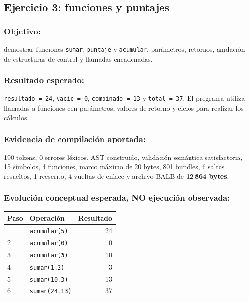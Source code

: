 \subsection{Ejercicio 3: funciones y puntajes}
\label{83-ejercicio-3-funciones-y-puntajes}

\subsubsection{Objetivo:} demostrar funciones
\texttt{sumar}, \texttt{puntaje} y
\texttt{acumular}, parámetros, retornos,
anidación de estructuras de control y
llamadas encadenadas.

\subsubsection{Resultado esperado:}
\texttt{resultado = 24},
\texttt{vacio = 0},
\texttt{combinado = 13} y
\texttt{total = 37}.
El programa utiliza llamadas a funciones
con parámetros, valores de retorno y ciclos
para realizar los cálculos.

\subsubsection{Evidencia de compilación aportada:}
190 tokens, 0 errores léxicos, AST construido,
validación semántica satisfactoria,
15 símbolos, 4 funciones, marco máximo
de 20 bytes, 801 bundles, 6 saltos
resueltos, 1 reescrito, 4 vueltas de
enlace y archivo BALB de
\textbf{12\,864 bytes}.

\subsubsection{Evolución conceptual esperada,
NO ejecución observada:}

\begin{longtable}[]{@{}llr@{}}
\toprule\noalign{}
Paso & Operación & Resultado \\
\midrule\noalign{}
\endhead
\bottomrule\noalign{}
\endlastfoot
1 & \texttt{acumular(5)} & 24 \\
2 & \texttt{acumular(0)} & 0 \\
3 & \texttt{acumular(3)} & 10 \\
4 & \texttt{sumar(1,2)} & 3 \\
5 & \texttt{sumar(10,3)} & 13 \\
6 & \texttt{sumar(24,13)} & 37 \\
\end{longtable}

